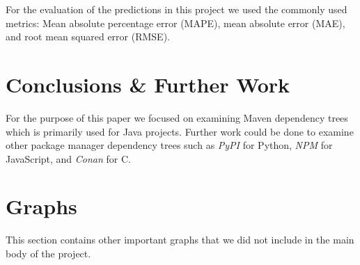 \documentclass[10pt, onecolumn]{IEEEtran}
\begin{document}
For the evaluation of the predictions in this project we used the commonly used metrics: Mean absolute percentage error (MAPE), mean absolute error (MAE), and root mean squared error (RMSE). 

\section{Conclusions \& Further Work}
For the purpose of this paper we focused on examining Maven dependency trees which is primarily used for Java projects. Further work could be done to examine other package manager dependency trees such as \textit{PyPI} for Python, \textit{NPM} for JavaScript, and \textit{Conan} for C. 


\appendices
\section{Graphs}
This section contains other important graphs that we did not include in the main body of the project.


\ifCLASSOPTIONcaptionsoff
  \newpage
\fi
\end{document}
